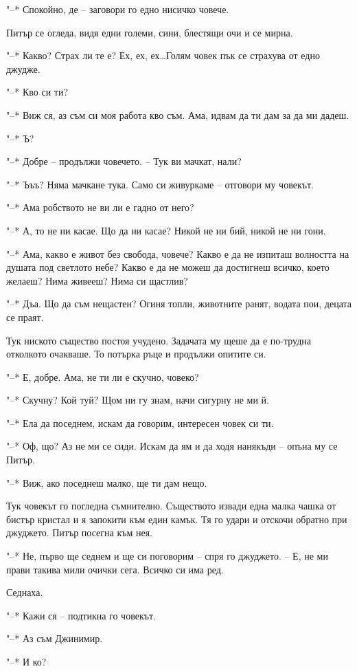 \documentclass[ebook,openany,12pt]{memoir}
\begin{document}
"--* Спокойно, де – заговори го едно нисичко човече.

Питър се огледа, видя едни големи, сини, блестящи очи и се мирна.

"--* Какво? Страх ли те е? Ех, ех, ех\ldots Голям човек пък се страхува от едно джудже.

"--* Кво си ти?

"--* Виж ся, аз съм си моя работа кво съм. Ама, идвам да ти дам за да ми дадеш.

"--* Ъ?

"--* Добре – продължи човечето. – Тук ви мачкат, нали?

"--* Ъъъ? Няма мачкане тука. Само си живуркаме – отговори му човекът.

"--* Ама робството не ви ли е гадно от него?

"--* А, то не ни касае. Що да ни касае? Никой не ни бий, никой не ни гони.

"--* Ама, какво е живот без свобода, човече? Какво е да не изпиташ волността на душата под светлото небе? Какво е да не можеш да достигнеш всичко, което желаеш? Нима живееш? Нима си щастлив?

"--* Дъа. Що да съм нещастен? Огиня топли, животните ранят, водата пои, децата се праят.

Тук ниското същество постоя учудено. Задачата му щеше да е по-трудна отколкото очакваше. То потърка ръце и продължи опитите си.

"--* Е, добре. Ама, не ти ли е скучно, човеко?

"--* Скучну? Кой туй? Щом ни гу знам, начи сигурну не ми й.

"--* Ела да поседнем, искам да говорим, интересен човек си ти.

"--* Оф, що? Аз не ми се сиди. Искам да ям и да ходя нанякъди – опъна му се Питър.

"--* Виж, ако поседнеш малко, ще ти дам нещо.

Тук човекът го погледна съмнително. Съществото извади една малка чашка от бистър кристал и я запокити към един камък. Тя го удари и отскочи обратно при джуджето. Питър посегна към нея.

"--* Не, първо ще седнем и ще си поговорим – спря го джуджето. – Е, не ми прави такива мили очички сега. Всичко си има ред.

Седнаха.

"--* Кажи ся – подтикна го човекът.

"--* Аз съм Джинимир.

"--* И ко?
\end{document}
